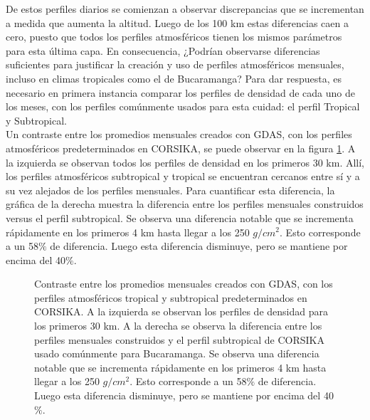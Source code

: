 De estos perfiles diarios se comienzan a observar discrepancias que se incrementan a medida que aumenta la altitud. Luego de los 100 km estas diferencias caen a cero, puesto que todos los perfiles atmosféricos tienen los mismos parámetros para esta última capa. En consecuencia, ¿Podrían observarse diferencias suficientes para justificar la creación y uso de perfiles atmosféricos mensuales, incluso en climas tropicales como el de Bucaramanga? Para dar respuesta, es necesario en primera instancia comparar los perfiles de densidad de cada uno de los meses, con los perfiles comúnmente usados para esta cuidad: el perfil Tropical y Subtropical. \\

Un contraste entre los promedios mensuales creados con GDAS, con los perfiles atmosféricos predeterminados en CORSIKA, se puede observar en la figura \ref{fig:fig16}. A la izquierda se observan todos los perfiles de densidad en los primeros 30 km. Allí, los perfiles atmosféricos subtropical y tropical se encuentran cercanos entre sí y a su vez alejados de los perfiles mensuales. Para cuantificar esta diferencia, la gráfica de la derecha muestra la diferencia entre los perfiles mensuales construidos versus el perfil subtropical. Se observa una diferencia notable que se incrementa rápidamente en los primeros 4 km hasta llegar a los 250 $g/cm^{2}$. Esto corresponde a un 58$\%$ de diferencia. Luego esta diferencia  disminuye, pero se mantiene por encima del 40$\%$.
\begin{figure}[htb!]
\caption[Promedios mensuales vs perfiles tropical y subtropical de CORSIKA.]{Contraste entre los promedios mensuales creados con GDAS, con los perfiles atmosféricos tropical y subtropical predeterminados en CORSIKA. A la izquierda se observan los perfiles de densidad para los primeros 30 km. A la derecha se observa la diferencia entre los perfiles mensuales construidos y el perfil subtropical de CORSIKA usado comúnmente para Bucaramanga. Se observa una diferencia notable que se incrementa rápidamente en los primeros 4 km hasta llegar a los 250 $g/cm^{2}$. Esto corresponde a un 58$\%$ de diferencia. Luego esta diferencia  disminuye, pero se mantiene por encima del 40$\%$.}
\label{fig:fig16}
\end{figure}

